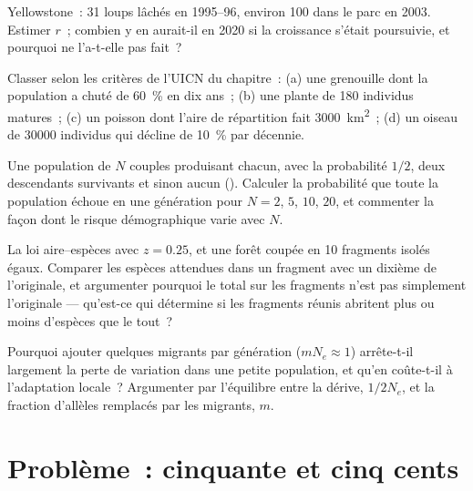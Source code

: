 \begin{exercise}[$\star\star$]\label{exo:b3:conservation-biology:8}
Yellowstone~: 31 loups lâchés en 1995--96, environ 100 dans le parc en
2003. Estimer $r$~; combien y en aurait-il en 2020 si la croissance
s'était poursuivie, et pourquoi ne l'a-t-elle pas fait~?
\end{exercise}

\begin{exercise}[$\star\star$]\label{exo:b3:conservation-biology:9}
Classer selon les critères de l'UICN du chapitre~: (a) une grenouille
dont la population a chuté de \qty{60}{\%} en dix ans~; (b) une plante
de 180 individus matures~; (c) un poisson dont l'aire de répartition
fait \qty{3000}{km^2}~; (d) un oiseau de \num{30000} individus qui
décline de \qty{10}{\%} par décennie.
\end{exercise}

\begin{exercise}[$\star\star\star$]\label{exo:b3:conservation-biology:10}
Une population de $N$ couples produisant chacun, avec la probabilité
$1/2$, deux descendants survivants et sinon aucun (). Calculer la probabilité que toute la population échoue
en une génération pour $N = 2$, $5$, $10$, $20$, et commenter la façon
dont le risque démographique varie avec $N$.
\end{exercise}

\begin{exercise}[$\star\star\star$]\label{exo:b3:conservation-biology:11}
La loi aire--espèces avec $z = 0.25$, et une forêt coupée en 10
fragments isolés égaux. Comparer les espèces attendues dans un fragment
avec un dixième de l'originale, et argumenter pourquoi le total sur les
fragments n'est pas simplement l'originale --- qu'est-ce qui détermine
si les fragments réunis abritent plus ou moins d'espèces que le tout~?
\end{exercise}

\begin{exercise}[$\star\star\star$]\label{exo:b3:conservation-biology:12}
Pourquoi ajouter quelques migrants par génération ($m N_{e} \approx 1$)
arrête-t-il largement la perte de variation dans une petite population,
et qu'en coûte-t-il à l'adaptation locale~? Argumenter par l'équilibre
entre la dérive, $1/2N_{e}$, et la fraction d'allèles remplacés par les
migrants, $m$.
\end{exercise}

\section{Problème~: cinquante et cinq cents}

